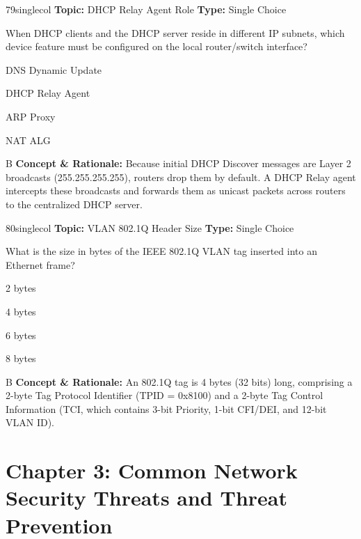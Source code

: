 \begin{qcard}{79}{singlecol}
\textcolor{darkslate!75}{\small\textbf{Topic:} DHCP Relay Agent Role \hfill \textbf{Type:} Single Choice}\vspace{0.4em}\par
When DHCP clients and the DHCP server reside in different IP subnets, which device feature must be configured on the local router/switch interface?
\begin{qoptions}
\item DNS Dynamic Update
\item DHCP Relay Agent
\item ARP Proxy
\item NAT ALG
\end{qoptions}
\end{qcard}
\nopagebreak
\begin{explainbox}{B}
\textbf{Concept \& Rationale:} Because initial DHCP Discover messages are Layer 2 broadcasts (255.255.255.255), routers drop them by default. A DHCP Relay agent intercepts these broadcasts and forwards them as unicast packets across routers to the centralized DHCP server.
\end{explainbox}

\begin{qcard}{80}{singlecol}
\textcolor{darkslate!75}{\small\textbf{Topic:} VLAN 802.1Q Header Size \hfill \textbf{Type:} Single Choice}\vspace{0.4em}\par
What is the size in bytes of the IEEE 802.1Q VLAN tag inserted into an Ethernet frame?
\begin{qoptions}
\item 2 bytes
\item 4 bytes
\item 6 bytes
\item 8 bytes
\end{qoptions}
\end{qcard}
\nopagebreak
\begin{explainbox}{B}
\textbf{Concept \& Rationale:} An 802.1Q tag is 4 bytes (32 bits) long, comprising a 2-byte Tag Protocol Identifier (TPID = 0x8100) and a 2-byte Tag Control Information (TCI, which contains 3-bit Priority, 1-bit CFI/DEI, and 12-bit VLAN ID).
\end{explainbox}

\section{Chapter 3: Common Network Security Threats and Threat Prevention}

